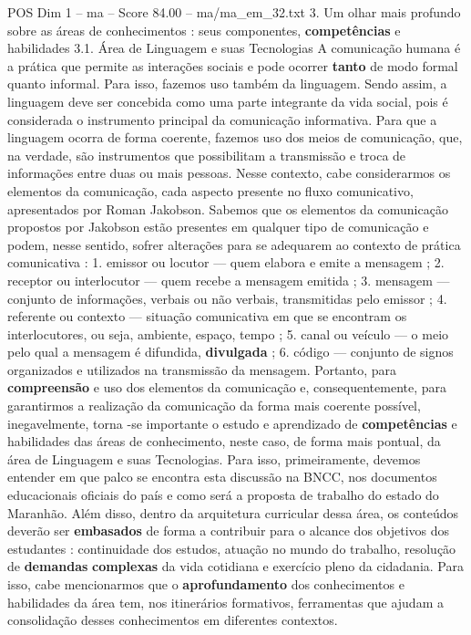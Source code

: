 \begin{textsample}{POS Dim 1 – ma – Score 84.00 – ma/ma\_em\_32.txt}  \label{ex:f1_pos_061}
3.
Um olhar mais profundo sobre as áreas de conhecimentos : seus componentes, \textbf{competências} e habilidades 3.1.
Área de Linguagem e suas Tecnologias A comunicação humana é a prática que permite as interações sociais e pode ocorrer \textbf{tanto} de modo formal quanto informal.
Para isso, fazemos uso também da linguagem.
Sendo assim, a linguagem deve ser concebida como uma parte integrante da vida social, pois é considerada o instrumento principal da comunicação informativa.
Para que a linguagem ocorra de forma coerente, fazemos uso dos meios de comunicação, que, na verdade, são instrumentos que possibilitam a transmissão e troca de informações entre duas ou mais pessoas.
Nesse contexto, cabe considerarmos os elementos da comunicação, cada aspecto presente no fluxo comunicativo, apresentados por Roman Jakobson.
Sabemos que os elementos da comunicação propostos por Jakobson estão presentes em qualquer tipo de comunicação e podem, nesse sentido, sofrer alterações para se adequarem ao contexto de prática comunicativa : 1. emissor ou locutor — quem elabora e emite a mensagem ; 2. receptor ou interlocutor — quem recebe a mensagem emitida ; 3. mensagem — conjunto de informações, verbais ou não verbais, transmitidas pelo emissor ; 4. referente ou contexto — situação comunicativa em que se encontram os interlocutores, ou seja, ambiente, espaço, tempo ; 5. canal ou veículo — o meio pelo qual a mensagem é difundida, \textbf{divulgada} ; 6. código — conjunto de signos organizados e utilizados na transmissão da mensagem.
Portanto, para \textbf{compreensão} e uso dos elementos da comunicação e, consequentemente, para garantirmos a realização da comunicação da forma mais coerente possível, inegavelmente, torna -se importante o estudo e aprendizado de \textbf{competências} e habilidades das áreas de conhecimento, neste caso, de forma mais pontual, da área de Linguagem e suas Tecnologias.
Para isso, primeiramente, devemos entender em que palco se encontra esta discussão na BNCC, nos documentos educacionais oficiais do país e como será a proposta de trabalho do estado do Maranhão.
Além disso, dentro da arquitetura curricular dessa área, os conteúdos deverão ser \textbf{embasados} de forma a contribuir para o alcance dos objetivos dos estudantes : continuidade dos estudos, atuação no mundo do trabalho, resolução de \textbf{demandas} \textbf{complexas} da vida cotidiana e exercício pleno da cidadania.
Para isso, cabe mencionarmos que o \textbf{aprofundamento} dos conhecimentos e habilidades da área tem, nos itinerários formativos, ferramentas que ajudam a consolidação desses conhecimentos em diferentes contextos.

\end{textsample}
